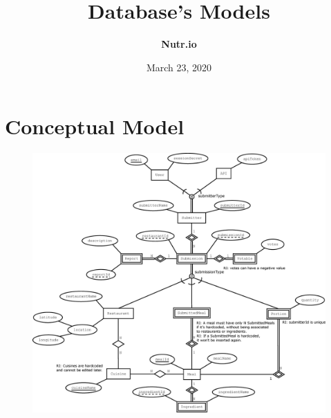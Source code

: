 \documentclass{article}
\title{\textbf{Database's Models}}
\date{March 23, 2020}
\author{\textbf{Nutr.io}}
\begin{document}
\maketitle

\section{Conceptual Model}

\begin{figure}[H]
    \includegraphics[scale=0.30]{Nutr.io_Database_Diagram.eps}
    \centering 
\end{figure}
\newpage
\end{document}

